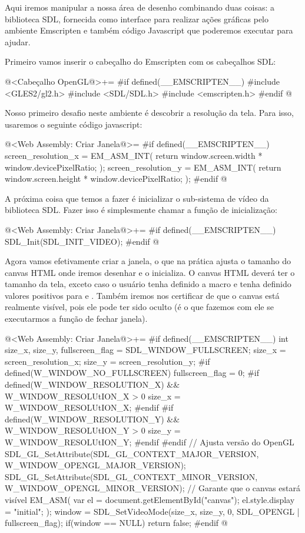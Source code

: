 Aqui iremos manipular a nossa área de desenho combinando duas coisas:
a biblioteca SDL, fornecida como interface para realizar ações
gráficas pelo ambiente Emscripten e também código Javascript que
poderemos executar para ajudar.

Primeiro vamos inserir o cabeçalho do Emscripten com os cabeçalhos SDL:

\iniciocodigo
@<Cabeçalho OpenGL@>+=
#if defined(__EMSCRIPTEN__)
#include <GLES2/gl2.h>
#include <SDL/SDL.h>
#include <emscripten.h>
#endif
@
\fimcodigo

Nosso primeiro desafio neste ambiente é descobrir a resolução da
tela. Para isso, usaremos o seguinte código javascript:

\iniciocodigo
@<Web Assembly: Criar Janela@>=
#if defined(__EMSCRIPTEN__)
screen_resolution_x = EM_ASM_INT({
  return window.screen.width * window.devicePixelRatio;
});
screen_resolution_y = EM_ASM_INT({
  return window.screen.height * window.devicePixelRatio;
});
#endif
@
\fimcodigo

A próxima coisa que temos a fazer é inicializar o sub-sistema de vídeo
da biblioteca SDL. Fazer isso é simplesmente chamar a função de
inicialização:

\iniciocodigo
@<Web Assembly: Criar Janela@>+=
#if defined(__EMSCRIPTEN__)
SDL_Init(SDL_INIT_VIDEO);
#endif
@
\fimcodigo

Agora vamos efetivamente criar a janela, o que na prática ajusta o
tamanho do canvas HTML onde iremos desenhar e o inicializa. O canvas
HTML deverá ter o tamanho da tela, exceto caso o usuário tenha
definido a macro  e tenha
definido valores positivos para 
e . Também iremos nos certificar
de que o canvas está realmente visível, pois ele pode ter sido oculto
(é o que fazemos com ele se executarmos a função de fechar janela).

\iniciocodigo
@<Web Assembly: Criar Janela@>+=
#if defined(__EMSCRIPTEN__)
{
  int size_x, size_y, fullscreen_flag = SDL_WINDOW_FULLSCREEN;
  size_x = screen_resolution_x;
  size_y = screen_resolution_y;
#if defined(W_WINDOW_NO_FULLSCREEN)
  fullscreen_flag = 0;
#if defined(W_WINDOW_RESOLUTION_X) && W_WINDOW_RESOLUtION_X > 0
  size_x = W_WINDOW_RESOLUtION_X;
#endif
#if defined(W_WINDOW_RESOLUTION_Y) && W_WINDOW_RESOLUtION_Y > 0
  size_y = W_WINDOW_RESOLUtION_Y;
#endif
#endif
  // Ajusta versão do OpenGL
  SDL_GL_SetAttribute(SDL_GL_CONTEXT_MAJOR_VERSION,
                     W_WINDOW_OPENGL_MAJOR_VERSION);
  SDL_GL_SetAttribute(SDL_GL_CONTEXT_MINOR_VERSION,
                     W_WINDOW_OPENGL_MINOR_VERSION);
  // Garante que o canvas estará visível
  EM_ASM(
    var el = document.getElementById("canvas");
    el.style.display = "initial";
  );
  window = SDL_SetVideoMode(size_x, size_y, 0,
                            SDL_OPENGL | fullscreen_flag);
  if(window == NULL)
    return false;
}
#endif
@
\fimcodigo

